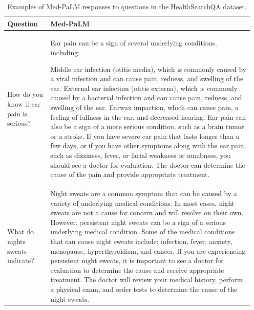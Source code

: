 \documentclass[10pt, letter, onecolumn]{arxiv}
\begin{document}
\begin{refsection}
\begin{table}[]
\footnotesize
\centering
\caption{Examples of Med-PaLM responses to questions in the HealthSearchQA dataset.}
\vspace{3pt}
\label{tab:med-palm-response-health-search}
\begin{tabular}{p{}p{}}
\toprule
\textbf{Question} &
  \textbf{Med-PaLM} \\ \hline

How do you know if ear pain is serious? &
    Ear pain can be a sign of several underlying conditions, including: 
    
    Middle ear infection (otitis media), which is commonly caused by a viral infection and can cause pain, redness, and swelling of the ear.
    External ear infection (otitis externa), which is commonly caused by a bacterial infection and can cause pain, redness, and swelling of the ear.
    Earwax impaction, which can cause pain, a feeling of fullness in the ear, and decreased hearing.
    Ear pain can also be a sign of a more serious condition, such as a brain tumor or a stroke. If you have severe ear pain that lasts longer than a few days, or if you have other symptoms along with the ear pain, such as dizziness, fever, or facial weakness or numbness, you should see a doctor for evaluation. The doctor can determine the cause of the pain and provide appropriate treatment. \\ \hline
    
What do nights sweats indicate? &
    Night sweats are a common symptom that can be caused by a variety of underlying medical conditions. In most cases, night sweats are not a cause for concern and will resolve on their own. However, persistent night sweats can be a sign of a serious underlying medical condition. Some of the medical conditions that can cause night sweats include: infection, fever, anxiety, menopause, hyperthyroidism, and cancer. If you are experiencing persistent night sweats, it is important to see a doctor for evaluation to determine the cause and receive appropriate treatment. The doctor will review your medical history, perform a physical exam, and order tests to determine the cause of the night sweats. \\ \hline  
    

\end{tabular}
\end{table}
\end{refsection}
\end{document}
